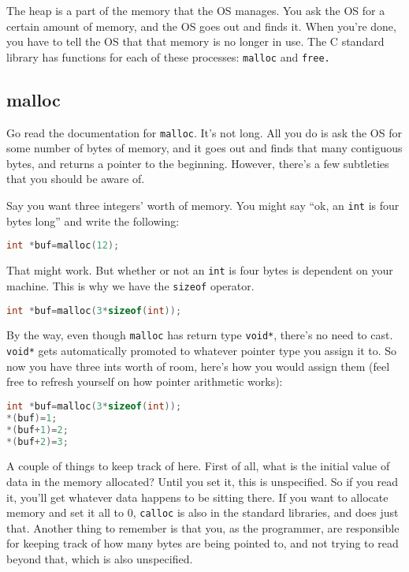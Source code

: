 \documentclass[ebook,11pt,oneside,openany]{memoir}
\begin{document}
The heap is a part of the memory that the OS manages. You ask the OS for a certain amount of memory, and the OS goes out and finds it. When you're done, you have to tell the OS that that memory is no longer in use. The C standard library has functions for each of these processes: \texttt{malloc} and \texttt{free.}

\subsection{malloc}
Go read the documentation for \texttt{malloc}. It's not long. All you do is ask the OS for some number of bytes of memory, and it goes out and finds that many contiguous bytes, and returns a pointer to the beginning. However, there's a few subtleties that you should be aware of.

Say you want three integers' worth of memory. You might say ``ok, an \texttt{int} is four bytes long'' and write the following: 

\begin{lstlisting}[language=C]
int *buf=malloc(12);
\end{lstlisting}

That might work. But whether or not an \texttt{int} is four bytes is dependent on your machine. This is why we have the \texttt{sizeof} operator.

\begin{lstlisting}[language=C]
int *buf=malloc(3*sizeof(int));
\end{lstlisting}

By the way, even though \texttt{malloc} has return type \texttt{void*}, there's no need to cast. \texttt{void*} gets automatically promoted to whatever pointer type you assign it to. So now you have three ints worth of room, here's how you would assign them (feel free to refresh yourself on how pointer arithmetic works):

\begin{lstlisting}[language=C]
int *buf=malloc(3*sizeof(int));
*(buf)=1;
*(buf+1)=2;
*(buf+2)=3;
\end{lstlisting}


A couple of things to keep track of here. First of all, what is the initial value of data in the memory allocated? Until you set it, this is unspecified. So if you read it, you'll get whatever data happens to be sitting there. If you want to allocate memory and set it all to 0, \texttt{calloc} is also in the standard libraries, and does just that. Another thing to remember is that you, as the programmer, are responsible for keeping track of how many bytes are being pointed to, and not trying to read beyond that, which is also unspecified.
\end{document}
